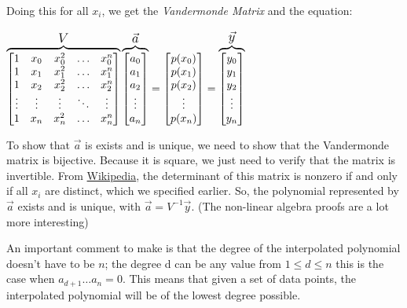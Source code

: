 \documentclass{article}
\begin{document}
Doing this for all $x_i$, we get the \textit{Vandermonde Matrix} and the equation:

\centerline{
    $
    \overbrace{
        \begin{bmatrix}
            1 & x_0 & x_0^2 & \ldots & x_0^n \\
            1 & x_1 & x_1^2 & \ldots & x_1^n \\
            1 & x_2 & x_2^2 & \ldots & x_2^n \\
            \vdots & \vdots & \vdots & \ddots & \vdots \\
            1 & x_n & x_n^2 & \ldots & x_n^n \\
        \end{bmatrix}
    }^{\text{\large $V$}}
    \overbrace{
        \begin{bmatrix}
            a_0 \\ a_1 \\ a_2 \\ \vdots \\ a_n 
        \end{bmatrix}
    }^{\text{\large $\vec{a}$}} = 
    \begin{bmatrix}
        p(x_0) \\ p(x_1) \\ p(x_2) \\ \vdots \\ p(x_n) 
    \end{bmatrix} = 
    \overbrace{
        \begin{bmatrix}
            y_0 \\ y_1 \\ y_2 \\ \vdots \\ y_n 
        \end{bmatrix}
    }^{\text{\large $\vec{y}$}}
    $
}

To show that $\vec{a}$ is exists and is unique, we need to show that the Vandermonde matrix is bijective. Because it is square, we just need to verify that the matrix is invertible. From \href{https://en.wikipedia.org/wiki/Vandermonde_matrix}{Wikipedia}, the determinant of this matrix is nonzero if and only if all $x_i$ are distinct, which we specified earlier. So, the polynomial represented by $\vec{a}$ exists and is unique, with $\vec{a}=V^{-1}\vec{y}$. (The non-linear algebra proofs are a lot more interesting)

An important comment to make is that the degree of the interpolated polynomial doesn't have to be $n$; the degree d can be any value from $1\le d\le n$ this is the case when $a_{d+1} \ldots a_n=0$. This means that given a set of data points, the interpolated polynomial will be of the lowest degree possible.
\end{document}
